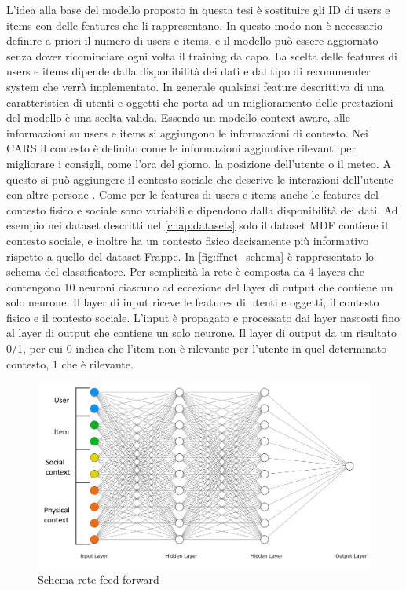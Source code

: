 \documentclass[12pt,italian]{report}
\begin{document}
L'idea alla base del modello proposto in questa tesi è sostituire gli ID di users e items con delle features che li rappresentano. In questo modo non è necessario definire a priori il numero di users e items, e il modello può essere aggiornato senza dover ricominciare ogni volta il training da capo. La scelta delle features di users e items dipende dalla disponibilità dei dati e dal tipo di recommender system che verrà implementato. In generale qualsiasi feature descrittiva di una caratteristica di utenti e oggetti che porta ad un miglioramento delle prestazioni del modello è una scelta valida. Essendo un modello context aware, alle informazioni su users e items si aggiungono le informazioni di contesto. Nei CARS il contesto è definito come le informazioni aggiuntive rilevanti per migliorare i consigli, come l'ora del giorno, la posizione dell'utente o il meteo. A questo si può aggiungere il contesto sociale che descrive le interazioni dell'utente con altre persone \cite{survey-mattia}. Come per le features di users e items anche le features del contesto fisico e sociale sono variabili e dipendono dalla disponibilità dei dati. Ad esempio nei dataset descritti nel \autoref{chap:datasets} solo il dataset MDF contiene il contesto sociale, e inoltre ha un contesto fisico decisamente più informativo rispetto a quello del dataset Frappe. In \autoref{fig:ffnet_schema} è rappresentato lo schema del classificatore. Per semplicità la rete è composta da 4 layers che contengono 10 neuroni ciascuno ad eccezione del layer di output che contiene un solo neurone. Il layer di input riceve le features di utenti e oggetti, il contesto fisico e il contesto sociale. L'input è propagato e processato dai layer nascosti fino al layer di output che contiene un solo neurone. Il layer di output da un risultato 0/1, per cui 0 indica che l'item non è rilevante per l'utente in quel determinato contesto, 1 che è rilevante.

\begin{figure}
  \includegraphics[width=\linewidth]{immagini/ffnet_schema.png}
  \caption{Schema rete feed-forward}
  \label{fig:ffnet_schema}
\end{figure}
\end{document}
